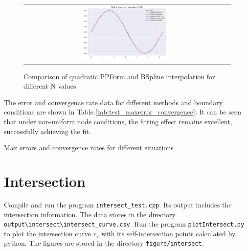 \documentclass[a4paper]{article}
\begin{document}
\begin{sloppypar}
\begin{figure}[H]
\begin{tabular}{cc}
    \includegraphics[width=0.45\textwidth]{../figure/test/BSpline3_N91.png}  \\
  \end{tabular}
  \renewcommand{\figurename}{Fig.}
  \caption{Comparison of quadratic PPForm and BSpline interpolation for different N values}
  \label{fig:test_quadratic}
\end{figure}

The error and convergence rate data for different methods and boundary conditions are shown in Table.\ref{tab:test_maxerror_convergence}:
It can be seen that under non-uniform node conditions, the fitting effect remains excellent, successfully achieving the fit.

\begin{table}[H]
  \centering
  \renewcommand{\tablename}{Table.}
  \caption{Max errors and convergence rates for different situations}
  \label{tab:test_maxerror_convergence}
\end{table}

\section*{Intersection}
Compile and run the program \verb|intersect_test.cpp|. Its output includes the intersection information. The data stores in the directory \verb|output\intersect\intersect_curve.csv|.
Run the program \verb|plotIntersect.py| to plot the intersection curve $r_4$ with its self-intersection points calculated by python. The figures are stored in the directory \verb|figure/intersect|.


\end{sloppypar}
\end{document}
